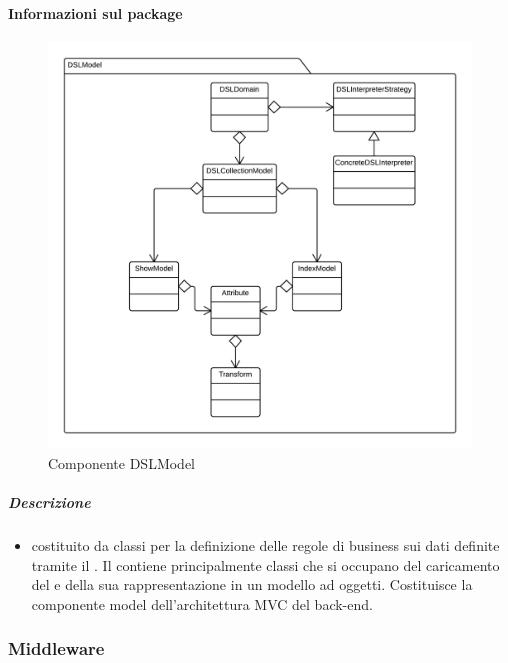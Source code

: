   \paragraph{Informazioni sul package} 
    \begin{figure}[H] 
      \begin{center} 
        \includegraphics[width=\textwidth]{uml/package/Back-end::Lib::Model::DSLModel.png}  
        \caption{Componente DSLModel}
      \end{center}  
    \end{figure} 
  \subparagraph{Descrizione} 
    \begin{itemize}
    \item[]  costituito da classi per la definizione delle regole di business sui dati definite tramite il  . Il  contiene principalmente classi che si occupano del caricamento del  e della sua rappresentazione in un modello ad oggetti. Costituisce la componente model dell’architettura MVC del back-end.

    \end{itemize} 
  \subsubsection{Middleware}
